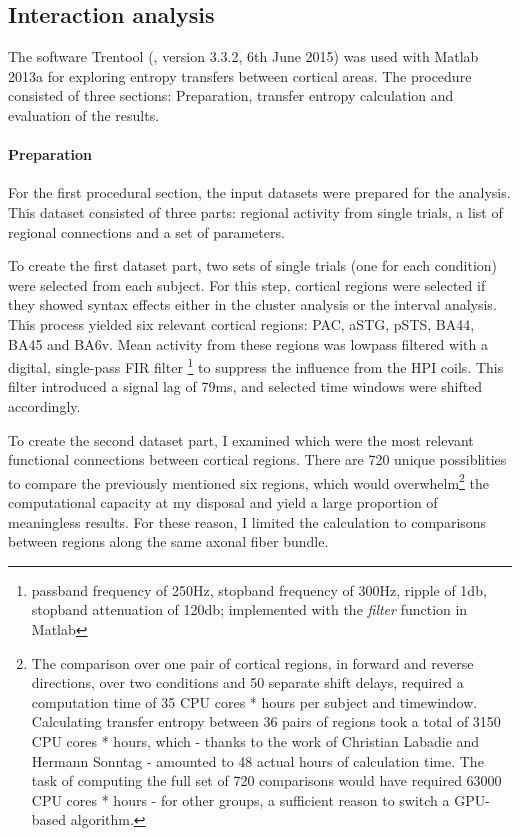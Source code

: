 \subsection{Interaction analysis}

The software Trentool (\cite{3.4.Trentool}, version 3.3.2, 6th June 2015) was used with Matlab 2013a for exploring entropy transfers between cortical areas.
The procedure consisted of three sections: Preparation, transfer entropy calculation and evaluation of the results.

\paragraph{Preparation}
For the first procedural section, the input datasets were prepared for the analysis.
This dataset consisted of three parts: regional activity from single trials, a list of regional connections and a set of parameters.

To create the first dataset part, two sets of single trials (one for each condition) were selected from each subject.
For this step, cortical regions were selected if they showed syntax effects either in the cluster analysis or the interval analysis.
This process yielded six relevant cortical regions: PAC, aSTG, pSTS, BA44, BA45 and BA6v.
Mean activity from these regions was lowpass filtered with a digital, single-pass FIR filter \footnote{passband frequency of 250Hz, stopband frequency of 300Hz, ripple of 1db, stopband attenuation of 120db; implemented with the \emph{filter} function in Matlab} to suppress the influence from the HPI coils.
This filter introduced a signal lag of 79ms, and selected time windows were shifted accordingly.

To create the second dataset part, I examined which were the most relevant functional connections between cortical regions.
There are 720 unique possiblities to compare the previously mentioned six regions, which would overwhelm\footnote{The comparison over one pair of cortical regions, in forward and reverse directions, over two conditions and 50 separate shift delays, required a computation time of 35 CPU cores * hours per subject and timewindow. Calculating transfer entropy between 36 pairs of regions took a total of 3150 CPU cores * hours, which - thanks to the work of Christian Labadie and Hermann Sonntag - amounted to 48 actual hours of calculation time. The task of computing the full set of 720 comparisons would have required 63000 CPU cores * hours - for other groups, a sufficient reason to switch a GPU-based algorithm\cite{3.4.gpuTE}.} the computational capacity at my disposal and yield a large proportion of meaningless results.
For these reason, I limited the calculation to comparisons between regions along the same axonal fiber bundle.

